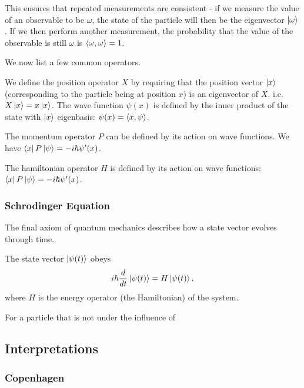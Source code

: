\documentclass[a4paper]{article}
\begin{document}
This ensures that repeated measurements are consistent - if we measure the value of an observable to be $\omega$, the state of the particle will then be the eigenvector $\left\lvert \omega \right\rangle$. If we then perform another measurement, the probability that the value of the observable is still $\omega$ is $\left\langle \omega , \omega \right\rangle = 1$.

We now list a few common operators.

\begin{defi} 
    We define the position operator $X$ by requiring that the position vector $\left\lvert x \right\rangle$ (corresponding to the particle being at position $x$) is an eigenvector of $X$. i.e.  $X\left\lvert x \right\rangle = x\left\lvert x \right\rangle$. The wave function $\psi(x)$ is defined by the inner product of the state with $\left\lvert x \right\rangle$ eigenbasis: $\psi(x) = \left\langle x , \psi \right\rangle$.
\end{defi}

\begin{defi} 
    The momentum operator $P$ can be defined by its action on wave functions. We have $\left\langle x \right\rvert P\left\lvert \psi \right\rangle = -i\hbar \psi'(x)$.
\end{defi}

\begin{defi} 
    The hamiltonian operator $H$ is defined by its action on wave functions: $\left\langle x \right\rvert P\left\lvert \psi \right\rangle = -i\hbar \psi'(x)$.
\end{defi}
 
\subsubsection{Schrodinger Equation}
The final axiom of quantum mechanics describes how a state vector evolves through time.

\begin{axiom}
    The state vector $\left\lvert \psi(t) \right\rangle$ obeys $$i\hbar \frac{d}{dt}\left\lvert \psi(t) \right\rangle = H\left\lvert \psi(t) \right\rangle,$$
    where $H$ is the energy operator (the Hamiltonian) of the system.
\end{axiom}

\begin{eg}
    For a particle that is not under the influence of 
\end{eg}

\subsection{Interpretations}
\subsubsection{Copenhagen}
\end{document}
